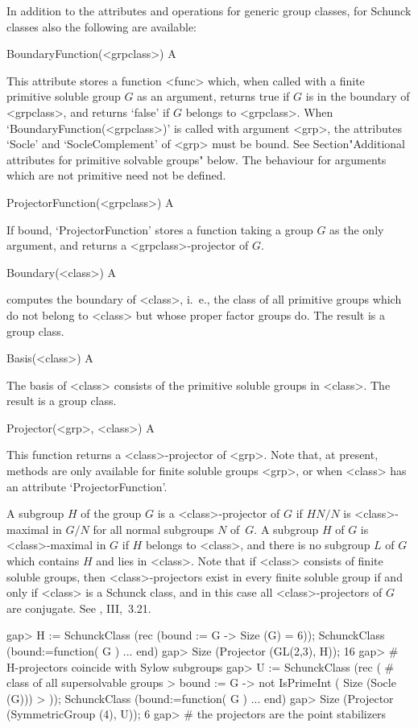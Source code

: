 In addition to the attributes and operations for generic group classes,
for Schunck classes also the following are available:

\>BoundaryFunction(<grpclass>) A

This attribute stores a function <func> which, when called with a finite primitive
soluble group $G$ as an argument, returns true if $G$ is in the boundary of <grpclass>,
and returns `false' if $G$ belongs to <grpclass>. When `BoundaryFunction(<grpclass>)'
is called with argument <grp>, the attributes `Socle' and `SocleComplement' of 
<grp> must be bound. See Section"Additional attributes for primitive solvable
groups" below. The behaviour for arguments which are not primitive need not
be defined. 

\>ProjectorFunction(<grpclass>) A

If bound, `ProjectorFunction' stores a function taking a group $G$ as the
only argument, and returns a <grpclass>-projector of $G$. 

\>Boundary(<class>) A

computes the boundary of <class>, i.~e., the class of all
primitive groups which do not belong to <class> but whose proper
factor groups do. The result is a group class. 

\>Basis(<class>) A

The basis of <class> consists of the primitive soluble 
groups in <class>. The result is a group class. 

\>Projector(<grp>, <class>) A

This function returns a <class>-projector of <grp>.
Note that, at present, methods are only available for finite
soluble groups <grp>, or when <class> has an attribute `ProjectorFunction'.

A subgroup 
$H$ of the group $G$ is a <class>-projector of $G$ if $H N/N$ is
<class>-maximal in $G/N$ for all normal subgroups $N$ of~$G$. A subgroup $H$
of $G$ is <class>-maximal in $G$ if $H$ belongs to <class>, and there is no
subgroup $L$ of $G$ which contains $H$ and lies in <class>. Note that if
<class> consists of finite soluble groups, then <class>-projectors exist in
every finite soluble group if and only if <class> is a Schunck class, and in
this case all <class>-projectors of
$G$ are conjugate. See \cite{DH1992}, III,~3.21.

\beginexample
gap> H := SchunckClass (rec (bound := G -> Size (G) = 6));
SchunckClass (bound:=function( G ) ... end)
gap> Size (Projector (GL(2,3), H)); 
16 
gap> # H-projectors coincide with Sylow subgroups
gap> U := SchunckClass (rec ( # class of all supersolvable groups
>    bound := G -> not IsPrimeInt ( Size (Socle (G)))
> )); 
SchunckClass (bound:=function( G ) ... end)
gap> Size (Projector (SymmetricGroup (4), U));
6 
gap> # the projectors are the point stabilizers
\endexample

